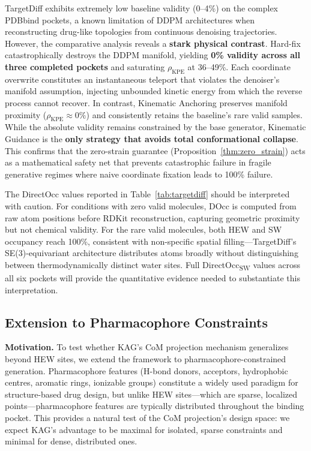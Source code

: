\documentclass{article}
\begin{document}
TargetDiff exhibits extremely low baseline validity (0--4\%) on the
complex PDBbind pockets, a known limitation of DDPM architectures when
reconstructing drug-like topologies from continuous denoising trajectories.
However, the comparative analysis reveals a \textbf{stark physical contrast}.
Hard-fix catastrophically destroys the DDPM manifold, yielding \textbf{0\%
validity across all three completed pockets} and saturating
$\rho_{\text{KPE}}$ at 36--49\%.  Each coordinate overwrite constitutes an
instantaneous teleport that violates the denoiser's manifold assumption,
injecting unbounded kinetic energy from which the reverse process cannot
recover.
In contrast, Kinematic Anchoring preserves manifold proximity
($\rho_{\text{KPE}} \approx 0\%$) and consistently retains the baseline's
rare valid samples.  While the absolute validity remains constrained by the
base generator, Kinematic Guidance is the \textbf{only strategy that avoids
total conformational collapse}.  This confirms that the zero-strain guarantee
(Proposition~\ref{thm:zero_strain}) acts as a mathematical safety net that prevents catastrophic failure
in fragile generative regimes where naive coordinate fixation leads to
100\% failure.

The DirectOcc values reported in Table~\ref{tab:targetdiff} should be
interpreted with caution.  For conditions with zero valid molecules, DOcc
is computed from raw atom positions before RDKit reconstruction, capturing
geometric proximity but not chemical validity.  For the rare valid
molecules, both HEW and SW occupancy reach 100\%, consistent with
non-specific spatial filling---TargetDiff's SE(3)-equivariant architecture
distributes atoms broadly without distinguishing between
thermodynamically distinct water sites.  Full DirectOcc\textsubscript{SW}
values across all six pockets will provide the quantitative evidence needed
to substantiate this interpretation.


\subsection{Extension to Pharmacophore Constraints}
\label{sec:pharmacophore}

\textbf{Motivation.}
To test whether KAG's CoM projection mechanism generalizes beyond HEW
sites, we extend the framework to pharmacophore-constrained generation.
Pharmacophore features (H-bond donors, acceptors, hydrophobic centres,
aromatic rings, ionizable groups) constitute a widely used paradigm for
structure-based drug design, but unlike HEW sites---which are sparse,
localized points---pharmacophore features are typically distributed
throughout the binding pocket.  This provides a natural test of the
CoM projection's design space: we expect KAG's advantage to be maximal
for isolated, sparse constraints and minimal for dense, distributed ones.
\end{document}
